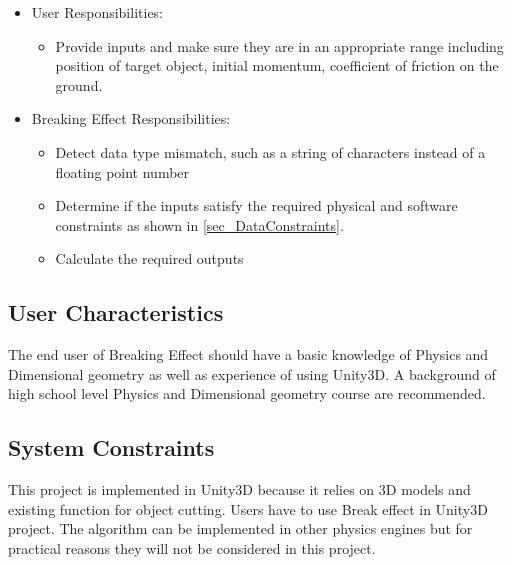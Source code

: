 \documentclass[12pt]{article}
\newcommand{\progname}{Breaking Effect} %
\begin{document}
	\begin{itemize}
		\item User Responsibilities:
		\begin{itemize}
			\item Provide inputs and make sure they are in an appropriate range including position of target object, initial momentum, coefficient of friction on the ground. 
		\end{itemize}
		\item \progname{} Responsibilities:
		\begin{itemize}
			\item Detect data type mismatch, such as a string of characters instead of a
			floating point number
			\item Determine if the inputs satisfy the required physical and software constraints as shown in \ref{sec_DataConstraints}.​ 
			\item Calculate the required outputs
		\end{itemize}
	\end{itemize}
	
	\subsection{User Characteristics} \label{SecUserCharacteristics}
	
	The end user of \progname{} should have a basic knowledge of Physics and Dimensional geometry as well as experience of using Unity3D. A background of high school level Physics and Dimensional geometry course are recommended. 
	
	\subsection{System Constraints}
	
	This project is implemented in Unity3D because it relies on 3D models and existing function for object cutting. Users have to use Break effect in Unity3D project. The algorithm can be implemented in other physics engines but for practical reasons they will not be considered in this project.  
	
\end{document}
